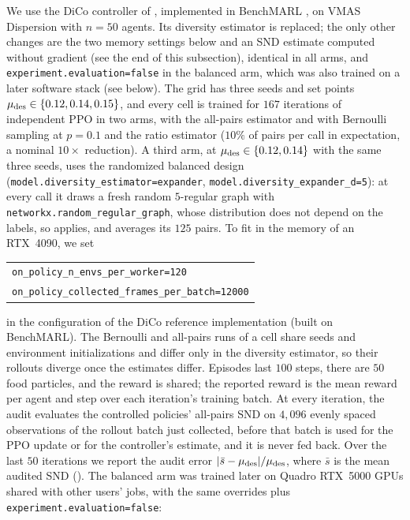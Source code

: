 We use the DiCo controller of \citet{bettini2024dico}, implemented in BenchMARL
\citep{bettini2024benchmarl}, on VMAS Dispersion with $n=50$ agents. Its
diversity estimator is replaced; the only other changes are the two memory settings below and an SND estimate computed without gradient (see the end of this subsection), identical in all arms, and \texttt{experiment.evaluation=false} in the balanced arm, which was also trained on a later software stack (see below). The grid has three
seeds and set points $\mu_{\mathrm{des}}\in\{0.12,0.14,0.15\}$, and every cell
is trained for $167$ iterations of independent PPO in two arms, with the all-pairs
estimator and with Bernoulli sampling at $p=0.1$ and the ratio estimator
($10\%$ of pairs per call in expectation, a nominal $10\times$ reduction).
A third arm, at $\mu_{\mathrm{des}}\in\{0.12,0.14\}$ with the same three seeds, uses the
randomized balanced design (\texttt{model.diversity\_estimator=expander},
\texttt{model.diversity\_expander\_d=5}): at every call it draws a fresh random
$5$-regular graph with \texttt{networkx.random\_regular\_graph}, whose distribution
does not depend on the labels, so  applies, and averages its
$125$ pairs. To fit in the memory of an RTX~4090, we set
\begin{center}
\small
\begin{tabular}{@{}l@{}}
\texttt{on\_policy\_n\_envs\_per\_worker=120}\\
\texttt{on\_policy\_collected\_frames\_per\_batch=12000}
\end{tabular}
\end{center}
in the configuration of the DiCo reference implementation (built on BenchMARL). The
Bernoulli and all-pairs runs of a cell share seeds and environment initializations and
differ only in the diversity estimator, so their rollouts diverge once the estimates
differ. Episodes last $100$ steps, there are $50$ food particles, and the reward is shared;
the reported reward is the mean reward per agent and step over each iteration's training
batch. At every iteration, the audit evaluates the controlled policies' all-pairs SND on
$4{,}096$ evenly spaced observations of the rollout batch just collected, before that batch
is used for the PPO update or for the controller's estimate, and it is never fed back. Over the last $50$
iterations we report the audit error $\lvert\bar s-\mu_{\mathrm{des}}\rvert/\mu_{\mathrm{des}}$, where $\bar s$ is
the mean audited SND ().
The balanced arm was trained later on Quadro RTX~5000 GPUs shared with other
users' jobs, with the same overrides plus \texttt{experiment.evaluation=false}:
